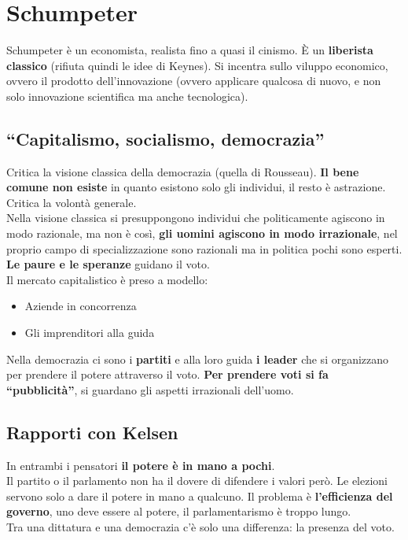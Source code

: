 
\section{Schumpeter}
Schumpeter è un economista, realista fino a quasi il cinismo. È un \textbf{liberista classico} 
(rifiuta quindi le idee di Keynes). Si incentra sullo viluppo economico, ovvero il prodotto 
dell'innovazione (ovvero applicare qualcosa di nuovo, e non solo innovazione scientifica ma anche 
tecnologica).

\subsection{``Capitalismo, socialismo, democrazia''}
Critica la visione classica della democrazia (quella di Rousseau). \textbf{Il bene comune non esiste}
in quanto esistono solo gli individui, il resto è astrazione. Critica la volontà generale.\\
Nella visione classica si presuppongono individui che politicamente agiscono in modo razionale,
ma non è così, \textbf{gli uomini agiscono in modo irrazionale}, nel proprio campo di 
specializzazione sono razionali ma in politica pochi sono esperti. \textbf{Le paure e le speranze}
guidano il voto.\\ [\baselineskip]
Il mercato capitalistico è preso a modello:
\begin{itemize}
  \item Aziende in concorrenza
  \item Gli imprenditori alla guida
\end{itemize}
Nella democrazia ci sono i \textbf{partiti} e alla loro guida \textbf{i leader} che si organizzano
per prendere il potere attraverso il voto. \textbf{Per prendere voti si fa ``pubblicità''}, si 
guardano gli aspetti irrazionali dell'uomo.

\subsection{Rapporti con Kelsen}
In entrambi i pensatori \textbf{il potere è in mano a pochi}.\\
Il partito o il parlamento non ha il dovere di difendere i valori però. Le elezioni servono solo a
dare il potere in mano a qualcuno. Il problema è \textbf{l'efficienza del governo}, uno deve essere
al potere, il parlamentarismo è troppo lungo.\\
Tra una dittatura e una democrazia c'è solo una differenza: la presenza del voto.
